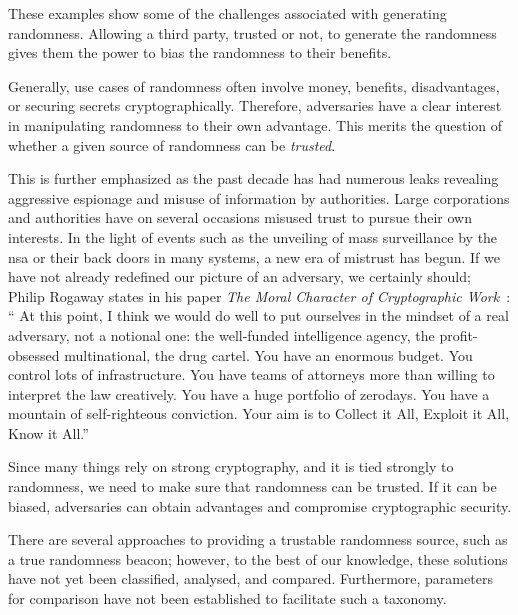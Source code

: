 These examples show some of the challenges associated with generating randomness. Allowing a third party, trusted or not, to generate the randomness gives them the power to bias the randomness to their benefits.

Generally, use cases of randomness often involve money, benefits, disadvantages, or securing secrets cryptographically. Therefore, adversaries have a clear interest in manipulating randomness to their own advantage.
This merits the question of whether a given source of randomness can be \emph{trusted}.

This is further emphasized as the past decade has had numerous leaks revealing aggressive espionage and misuse of information by authorities.
Large corporations and authorities have on several occasions misused trust to pursue their own interests.
In the light of events such as the unveiling of mass surveillance by the \gls{nsa} or their back doors in many systems, a new era of mistrust has begun.
If we have not already redefined our picture of an adversary, we certainly should;
Philip Rogaway states in his paper \textit{The Moral Character of Cryptographic Work}~\cite{rogaway2015moral}:
\enquote{%
    At this point, I think we would do well to put ourselves in the mindset of a real adversary, not a notional one:
    the well-funded intelligence agency, the profit-obsessed multinational, the drug cartel.
    You have an enormous budget. You control lots of infrastructure.
    You have teams of attorneys more than willing to interpret the law creatively.
    You have a huge portfolio of zerodays. You have a mountain of self-righteous conviction.
    Your aim is to Collect it All, Exploit it All, Know it All.}%


Since many things rely on strong cryptography, and it is tied strongly to randomness, we need to make sure that randomness can be trusted. If it can be biased, adversaries can obtain advantages and compromise cryptographic security.

There are several approaches to providing a trustable randomness source, such as a true randomness beacon; however, to the best of our knowledge, these solutions have not yet been classified, analysed, and compared.
Furthermore, parameters for comparison have not been established to facilitate such a taxonomy.

